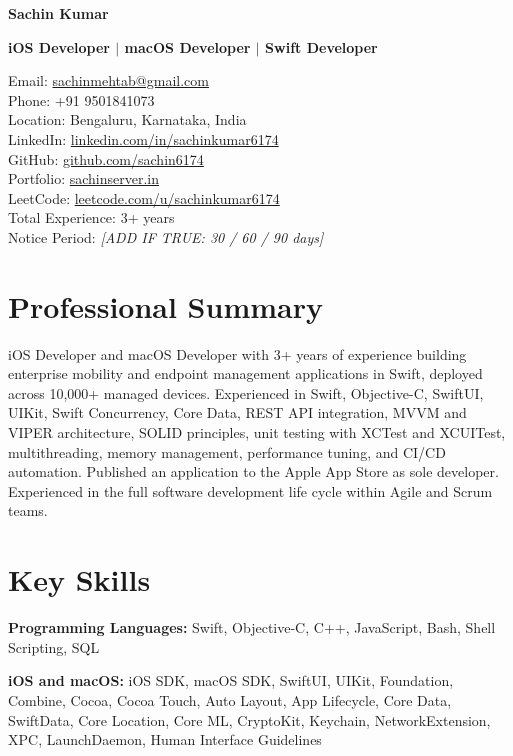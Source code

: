 \documentclass[letterpaper,11pt]{article}
\begin{document}
{\LARGE \textbf{Sachin Kumar}}

\vspace{4pt}
{\large \textbf{iOS Developer $\vert$ macOS Developer $\vert$ Swift Developer}}

\vspace{4pt}
Email: \href{mailto:sachinmehtab@gmail.com}{sachinmehtab@gmail.com} \\
Phone: +91 9501841073 \\
Location: Bengaluru, Karnataka, India \\
LinkedIn: \href{https://linkedin.com/in/sachinkumar6174}{linkedin.com/in/sachinkumar6174} \\
GitHub: \href{https://github.com/sachin6174}{github.com/sachin6174} \\
Portfolio: \href{https://www.sachinserver.in}{sachinserver.in} \\
LeetCode: \href{https://leetcode.com/u/sachinkumar6174/}{leetcode.com/u/sachinkumar6174} \\
Total Experience: 3+ years \\
Notice Period: \textit{[ADD IF TRUE: 30 / 60 / 90 days]}

\section*{Professional Summary}

iOS Developer and macOS Developer with 3+ years of experience building enterprise mobility
and endpoint management applications in Swift, deployed across 10,000+ managed devices.
Experienced in Swift, Objective-C, SwiftUI, UIKit, Swift Concurrency, Core Data, REST API
integration, MVVM and VIPER architecture, SOLID principles, unit testing with XCTest and
XCUITest, multithreading, memory management, performance tuning, and CI/CD automation.
Published an application to the Apple App Store as sole developer. Experienced in the full
software development life cycle within Agile and Scrum teams.

\section*{Key Skills}

\textbf{Programming Languages:} Swift, Objective-C, C++, JavaScript, Bash, Shell Scripting, SQL

\vspace{3pt}
\textbf{iOS and macOS:} iOS SDK, macOS SDK, SwiftUI, UIKit, Foundation, Combine, Cocoa,
Cocoa Touch, Auto Layout, App Lifecycle, Core Data, SwiftData, Core Location, Core ML,
CryptoKit, Keychain, NetworkExtension, XPC, LaunchDaemon, Human Interface Guidelines
\end{document}
